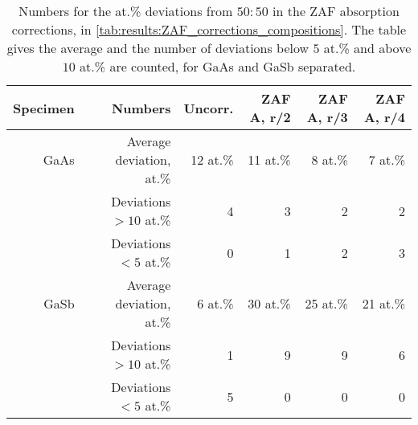 \begin{table}[phtb]
    \begin{center}
        \caption{
            Numbers for the at.\% deviations from $50:50$ in the ZAF absorption corrections, in \cref{tab:results:ZAF_corrections_compositions}.
            The table gives the average and the number of deviations below $5$ at.\% and above $10$ at.\% are counted, for GaAs and GaSb separated.
        }
        \label{tab:results:ZAF_corrections_compositions_stats}
        \begin{tabular}{rrrrrr}
            \hline
            \textbf{Specimen} & \textbf{Numbers}         & \textbf{Uncorr.} & \textbf{ZAF A, r/2} & \textbf{ZAF A, r/3} & \textbf{ZAF A, r/4} \\
            \hline

            GaAs              & Average deviation, at.\% & 12 at.\%         & 11 at.\%            & 8 at.\%             & 7 at.\%             \\
                              & Deviations $>10$ at.\%   & 4                & 3                   & 2                   & 2                   \\
                              & Deviations  $<5$  at.\%  & 0                & 1                   & 2                   & 3                   \\
            \hline
            GaSb              & Average deviation, at.\% & 6 at.\%          & 30 at.\%            & 25 at.\%            & 21 at.\%            \\
                              & Deviations $>10$ at.\%   & 1                & 9                   & 9                   & 6                   \\
                              & Deviations  $<5$  at.\%  & 5                & 0                   & 0                   & 0                   \\

            \hline
        \end{tabular}
    \end{center}
\end{table}
